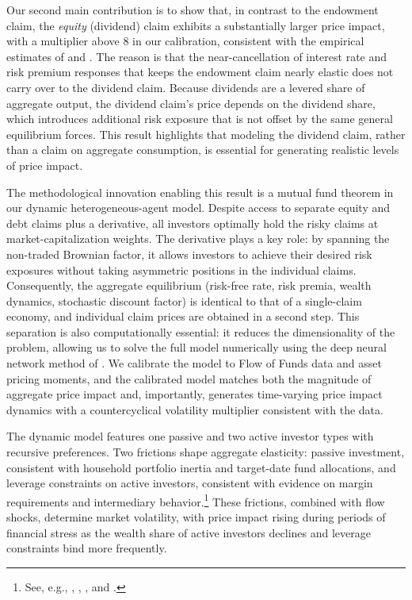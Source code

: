 \documentclass[12pt,english]{article}
\begin{document}
Our second main contribution is to show that, in contrast to the endowment claim, the \emph{equity} (dividend) claim exhibits a substantially larger price impact, with a multiplier above 8 in our calibration, consistent with the empirical estimates of \citet{gabaix2020search} and \citet{koijen2024investors}. The reason is that the near-cancellation of interest rate and risk premium responses that keeps the endowment claim nearly elastic does not carry over to the dividend claim. Because dividends are a levered share of aggregate output, the dividend claim's price depends on the dividend share, which introduces additional risk exposure that is not offset by the same general equilibrium forces. This result highlights that modeling the dividend claim, rather than a claim on aggregate consumption, is essential for generating realistic levels of price impact.

The methodological innovation enabling this result is a mutual fund theorem in our dynamic heterogeneous-agent model. Despite access to separate equity and debt claims plus a derivative, all investors optimally hold the risky claims at market-capitalization weights. The derivative plays a key role: by spanning the non-traded Brownian factor, it allows investors to achieve their desired risk exposures without taking asymmetric positions in the individual claims. Consequently, the aggregate equilibrium (risk-free rate, risk premia, wealth dynamics, stochastic discount factor) is identical to that of a single-claim economy, and individual claim prices are obtained in a second step. This separation is also computationally essential: it reduces the dimensionality of the problem, allowing us to solve the full model numerically using the deep neural network method of \citet{duarte2024machine}. We calibrate the model to Flow of Funds data and asset pricing moments, and the calibrated model matches both the magnitude of aggregate price impact and, importantly, generates time-varying price impact dynamics with a countercyclical volatility multiplier consistent with the data.

The dynamic model features one passive and two active investor types with recursive preferences. Two frictions shape aggregate elasticity: passive investment, consistent with household portfolio inertia and target-date fund allocations, and leverage constraints on active investors, consistent with evidence on margin requirements and intermediary behavior.\footnote{See, e.g., \citet{brunnermeier2009market}, \citet{garleanu2011margin}, \citet{chabakauri2013dynamic}, and \citet{adrian2014procyclical}.} These frictions, combined with flow shocks, determine market volatility, with price impact rising during periods of financial stress as the wealth share of active investors declines and leverage constraints bind more frequently.
\end{document}
